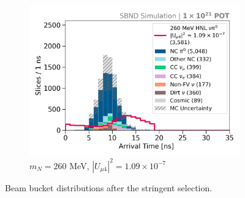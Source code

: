 \begin{figure}[hb!]
\begin{subfigure}[b]{0.495\textwidth}
            \includegraphics[width=\textwidth]{m260}
            \caption{$m_N = 260$ MeV, $|U_{\mu4}|^2 = 1.09 \times 10^{-7}$ }
        \end{subfigure}
        \caption[Stringent Beam Bucket Distributions in the Mass Range 220 - 260 MeV]{
	Beam bucket distributions after the stringent selection.
	}
\end{figure}
